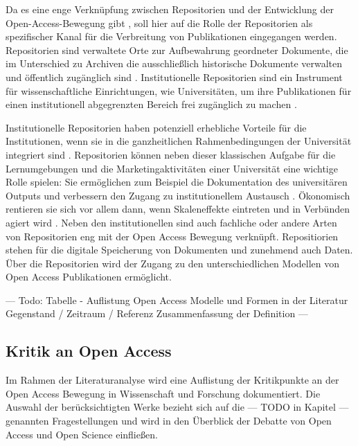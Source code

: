 Da es eine enge Verknüpfung zwischen Repositorien und der Entwicklung der Open-Access-Bewegung gibt \cite{offhaus_2012_institutionelle_repos}, soll hier auf die Rolle der Repositorien als spezifischer Kanal für die Verbreitung von Publikationen eingegangen werden. Repositorien sind verwaltete Orte zur Aufbewahrung geordneter Dokumente, die im Unterschied zu Archiven die ausschließlich historische Dokumente verwalten und öffentlich zugänglich sind \cite{suchen}. Institutionelle Repositorien sind ein Instrument für wissenschaftliche Einrichtungen, wie Universitäten, um ihre Publikationen für einen institutionell abgegrenzten Bereich frei zugänglich zu machen \cite{dobratz_2007_open}.

Institutionelle Repositorien haben potenziell erhebliche Vorteile für die Institutionen, wenn sie in die ganzheitlichen Rahmenbedingungen der Universität integriert sind \cite{steele_2006}. Repositorien können neben dieser klassischen Aufgabe für die Lernumgebungen und die Marketingaktivitäten einer Universität eine wichtige Rolle spielen: Sie ermöglichen zum Beispiel die Dokumentation des universitären Outputs und verbessern den Zugang zu institutionellem Austausch \cite{steele_2006}. Ökonomisch rentieren sie sich vor allem dann, wenn Skaleneffekte eintreten und in Verbünden agiert wird \cite{blythe_2005value}. Neben den institutionellen sind auch fachliche oder andere Arten von Repositorien eng mit der Open Access Bewegung verknüpft. Repositiorien stehen  für die digitale Speicherung von Dokumenten und zunehmend auch Daten. Über die Repositorien wird der Zugang zu den unterschiedlichen Modellen von Open Access Publikationen ermöglicht.

--- Todo: Tabelle - Auflistung Open Access  Modelle und Formen in der Literatur  
Gegenstand / Zeitraum / Referenz
Zusammenfassung der Definition --- 

\subsection{Kritik an Open Access}

Im Rahmen der Literaturanalyse wird eine Auflistung der Kritikpunkte an der Open Access Bewegung in Wissenschaft und Forschung dokumentiert. Die Auswahl der berücksichtigten Werke bezieht sich auf die --- TODO in Kapitel --- genannten Fragestellungen und wird in den Überblick der Debatte von Open Access und Open Science einfließen.

